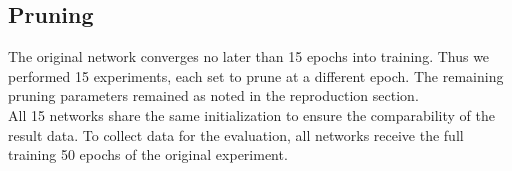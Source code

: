 \subsection*{Pruning}
The original network converges no later than 15 epochs into training. Thus we performed 15 experiments, each set to prune at a different epoch. The remaining pruning parameters remained as noted in the reproduction section.\\
All 15 networks share the same initialization to ensure the comparability of the result data. To collect data for the evaluation, all networks receive the full training 50 epochs of the original experiment.

